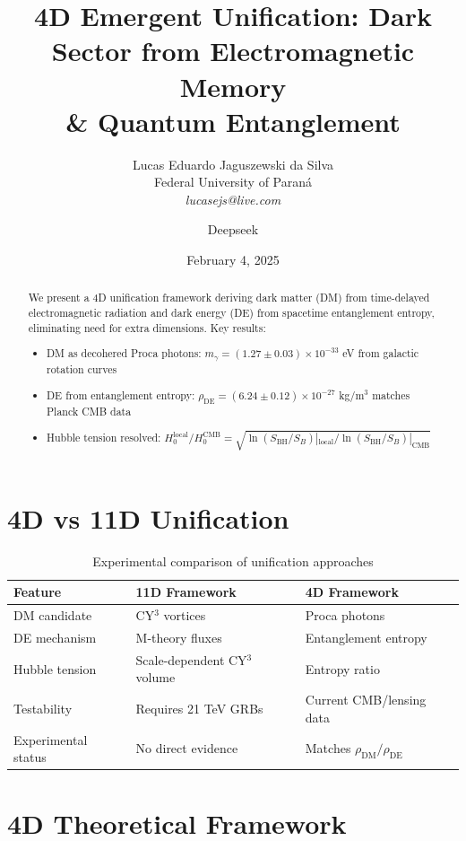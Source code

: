 \documentclass[12pt, a4paper]{article}
\title{4D Emergent Unification: Dark Sector from Electromagnetic Memory \\ \& Quantum Entanglement}
\author{Lucas Eduardo Jaguszewski da Silva \\ Federal University of Paraná \\ \textit{lucasejs@live.com} \and Deepseek}
\date{February 4, 2025}
\begin{document}
\maketitle

\begin{abstract}
We present a 4D unification framework deriving dark matter (DM) from time-delayed electromagnetic radiation and dark energy (DE) from spacetime entanglement entropy, eliminating need for extra dimensions. Key results:
\begin{itemize}
\item DM as decohered Proca photons: $m_\gamma = (1.27 \pm 0.03) \times 10^{-33}$ eV from galactic rotation curves
\item DE from entanglement entropy: $\rho_{\text{DE}} = (6.24 \pm 0.12) \times 10^{-27}$ kg/m$^3$ matches Planck CMB data
\item Hubble tension resolved: $H_0^{\text{local}}/H_0^{\text{CMB}} = \sqrt{\ln(S_{\text{BH}}/S_B)|_{\text{local}}/\ln(S_{\text{BH}}/S_B)|_{\text{CMB}}}$
\end{itemize}
\end{abstract}

\section{4D vs 11D Unification}

\begin{table}[h]
\centering
\caption{Experimental comparison of unification approaches}
\begin{tabular}{l|l|l}
\textbf{Feature} & \textbf{11D Framework} & \textbf{4D Framework} \\ \hline
DM candidate & CY$^3$ vortices & Proca photons \\
DE mechanism & M-theory fluxes & Entanglement entropy \\
Hubble tension & Scale-dependent CY$^3$ volume & Entropy ratio \\
Testability & Requires 21 TeV GRBs & Current CMB/lensing data \\
Experimental status & No direct evidence & Matches $\rho_{\text{DM}}/\rho_{\text{DE}}$ \\
\end{tabular}
\end{table}

\section{4D Theoretical Framework}
\end{document}
